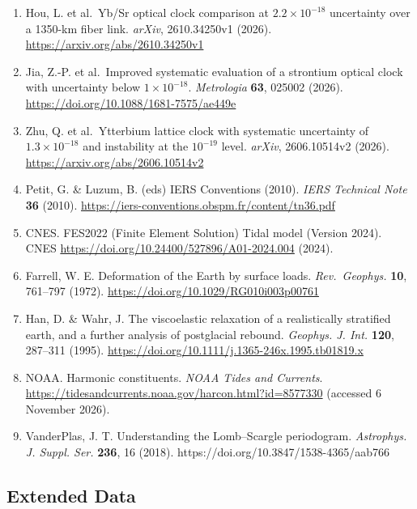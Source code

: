 \documentclass[
  10pt,
  a4paper,
]{article}
\begin{document}
\begin{enumerate}
  requirements of optical clock networks for validating
  satellite-derived time-variable gravity data. \emph{Geophys. J. Int.}
  \textbf{226}, 764--779 (2021).
  \url{https://academic.oup.com/gji/article/226/2/764/6212226}
\item
  Hou, L. et al.~Yb/Sr optical clock comparison at \(2.2\times10^{-18}\)
  uncertainty over a 1350-km fiber link. \emph{arXiv}, 2610.34250v1
  (2026). \url{https://arxiv.org/abs/2610.34250v1}
\item
  Jia, Z.-P. et al.~Improved systematic evaluation of a strontium
  optical clock with uncertainty below \(1\times10^{-18}\).
  \emph{Metrologia} \textbf{63}, 025002 (2026).
  \url{https://doi.org/10.1088/1681-7575/ae449e}
\item
  Zhu, Q. et al.~Ytterbium lattice clock with systematic uncertainty of
  \(1.3\times 10^{-18}\) and instability at the \(10^{-19}\) level.
  \emph{arXiv}, 2606.10514v2 (2026).
  \url{https://arxiv.org/abs/2606.10514v2}
\item
  Petit, G. \& Luzum, B. (eds) IERS Conventions (2010). \emph{IERS
  Technical Note} \textbf{36} (2010).
  \url{https://iers-conventions.obspm.fr/content/tn36.pdf}
\item
  CNES. FES2022 (Finite Element Solution) Tidal model (Version 2024).
  CNES \url{https://doi.org/10.24400/527896/A01-2024.004} (2024).
\item
  Farrell, W. E. Deformation of the Earth by surface loads.
  \emph{Rev.~Geophys.} \textbf{10}, 761--797 (1972).
  \url{https://doi.org/10.1029/RG010i003p00761}
\item
  Han, D. \& Wahr, J. The viscoelastic relaxation of a realistically
  stratified earth, and a further analysis of postglacial rebound.
  \emph{Geophys. J. Int.} \textbf{120}, 287--311 (1995).
  \url{https://doi.org/10.1111/j.1365-246x.1995.tb01819.x}
\item
  NOAA. Harmonic constituents. \emph{NOAA Tides and Currents}.
  \url{https://tidesandcurrents.noaa.gov/harcon.html?id=8577330}
  (accessed 6 November 2026).
\item
  VanderPlas, J. T. Understanding the Lomb--Scargle periodogram.
  \emph{Astrophys. J. Suppl. Ser.} \textbf{236}, 16 (2018).
  https://doi.org/10.3847/1538-4365/aab766
\end{enumerate}

\clearpage

\singlespacing\sffamily\fontsize{7}{9}\selectfont

\hypertarget{extended-data}{%
\subsection{Extended Data}\label{extended-data}}
\end{document}
